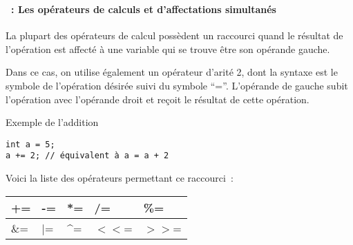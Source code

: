 \begin{frame}[containsverbatim]
  \frametitle{\secname}
  \framesubtitle{\subsecname~: Les opérateurs de calculs et d'affectations simultanés} 

  La plupart des opérateurs de calcul possèdent un raccourci quand le résultat de l'opération est affecté à une variable qui se trouve être son opérande gauche.
  \vspace{0.3cm}
  \par
  Dans ce cas, on utilise également un opérateur d'arité 2, dont la syntaxe est le symbole de l'opération désirée suivi du symbole ``=''. L'opérande de gauche subit 
  l'opération avec l'opérande droit et reçoit le résultat de cette opération.
  \begin{exampleblock}{Exemple de l'addition}
    \begin{verbatim}
int a = 5;
a += 2; // équivalent à a = a + 2\end{verbatim}
  \end{exampleblock}
  Voici la liste des opérateurs permettant ce raccourci~:
  \begin{center}
    \begin{tabular}{|>{\centering\arraybackslash}m{1.5cm}|>{\centering\arraybackslash}m{1.5cm}|>{\centering\arraybackslash}m{1.5cm}|>{\centering\arraybackslash}m{1.5cm}|>{\centering\arraybackslash}m{1.5cm}|}
      \hline
      += & -= & *= & /= & \%= \\
      \hline
      \&= & |= & \^{ }= & $<<$= & $>>$= \\
      \hline
    \end{tabular}
  \end{center}  
\end{frame}

